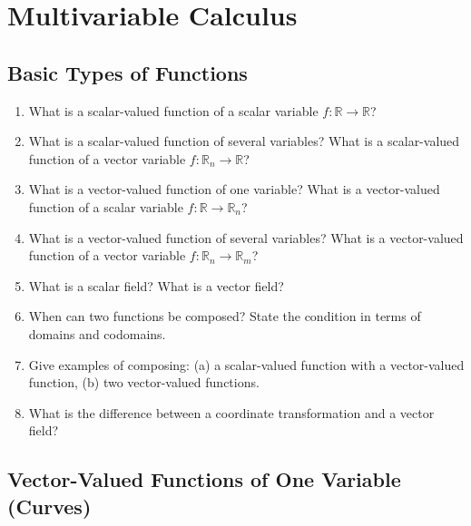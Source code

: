 \section{Multivariable Calculus}

\subsection{Basic Types of Functions}

\begin{enumerate}
  \item What is a scalar-valued function of a scalar variable \(f:\mathbb{R}\to \mathbb{R}\)?
  \item What is a scalar-valued function of several variables? What is a scalar-valued function of a vector variable \(f:\mathbb{R}_{n} \to \mathbb{R}\)?
  \item What is a vector-valued function of one variable? What is a vector-valued function of a scalar variable \(f:\mathbb{R}\to \mathbb{R}_{n}\)?
  \item What is a vector-valued function of several variables? What is a vector-valued function of a vector variable \(f:\mathbb{R}_{n} \to \mathbb{R}_{m}\)?
  \item What is a scalar field? What is a vector field?
  \item When can two functions be composed? State the condition in terms of domains and codomains.
  \item Give examples of composing: (a) a scalar-valued function with a vector-valued function, (b) two vector-valued functions.
  \item What is the difference between a coordinate transformation and a vector field?
\end{enumerate}

\subsection{Vector-Valued Functions of One Variable (Curves)}

